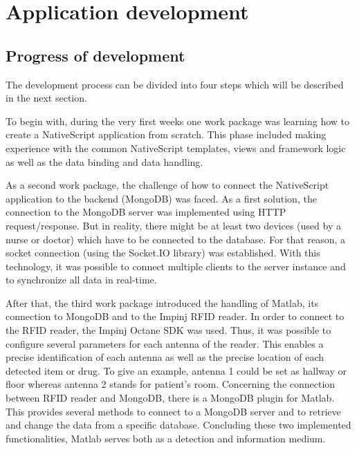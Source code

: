 \section{Application development} \label{app_development}

\subsection{Progress of development}

The development process can be divided into four steps which will be described in the next section. 

To begin with, during the very first weeks one work package was learning how to create a NativeScript application from scratch. This phase included making experience with the common NativeScript templates, views and framework logic as well as the data binding and data handling.

As a second work package, the challenge of how to connect the NativeScript application to the backend (MongoDB) was faced. As a first solution, the connection to the MongoDB server was implemented using HTTP request/response. But in reality, there might be at least two devices (used by a nurse or doctor) which have to be connected to the database. For that reason, a socket connection (using the Socket.IO library) was established. With this technology, it was possible to connect multiple clients to the server instance and to synchronize all data in real-time.

After that, the third work package introduced the handling of Matlab, its connection to MongoDB and to the Impinj RFID reader. In order to connect to the RFID reader, the Impinj Octane SDK was used. Thus, it was possible to configure several parameters for each antenna of the reader. This enables a precise identification of each antenna as well as the precise location of each detected item or drug. To give an example, antenna 1 could be set as hallway or floor whereas antenna 2 stands for patient's room. 
Concerning the connection between RFID reader and MongoDB, there is a MongoDB plugin for Matlab. This provides several methods to connect to a MongoDB server and to retrieve and change the data from a specific database. Concluding these two implemented functionalities, Matlab serves both as a detection and information medium.

